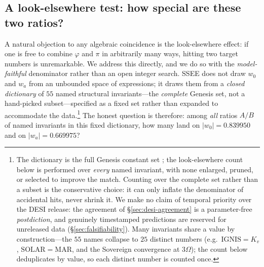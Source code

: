 \documentclass[a4paper,11pt]{article}
\begin{document}
\subsection{A look-elsewhere test: how special are these two ratios?}
\label{sec:look-elsewhere}
A natural objection to any algebraic coincidence is the look-elsewhere
effect: if one is free to combine $\varphi$ and $\pi$ in arbitrarily many
ways, hitting two target numbers is unremarkable. We address this directly,
and we do so with the \emph{model-faithful} denominator rather than an open
integer search. SSEE does not draw $w_0$ and $w_a$ from an unbounded space of
expressions; it draws them from a \emph{closed dictionary} of
$55$ named structural invariants---the \emph{complete} Genesis set,
not a hand-picked subset---specified as a fixed set rather than expanded to
accommodate the data.\footnote{The dictionary is the full Genesis constant
set \citep{AlmeidaSSEE2026genesis}; the look-elsewhere count below is performed
over \emph{every} named invariant, with none enlarged, pruned, or selected to
improve the match. Counting over the complete set rather than a subset is the
conservative choice: it can only inflate the denominator of accidental hits, never
shrink it. We make no claim of temporal priority
over the DESI release: the agreement of \S\ref{sec:desi-agreement} is a
parameter-free \emph{postdiction}, and genuinely timestamped predictions are
reserved for unreleased data (\S\ref{sec:falsifiability}). Many invariants
share a value by construction---the $55$ names collapse to $25$ distinct numbers
(e.g.\ $\mathrm{IGNIS}=K_v$, $\mathrm{SOLAR}=\mathrm{MAR}$, and the Sovereign
convergence at $3\Omega$); the count below deduplicates by value, so each
distinct number is counted once.} The honest question is therefore: among
\emph{all} ratios $A/B$ of named invariants in this fixed dictionary, how many
land on $|w_0|=0.839950$ and on $|w_a|=0.669975$?
\end{document}
